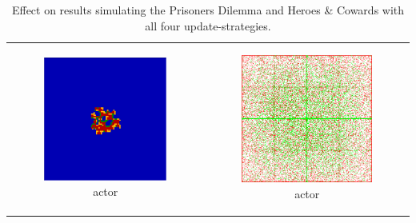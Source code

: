 \begin{table}
\begin{tabular}{c c}
		\begin{subfigure}[b]{0.4\textwidth}
			\centering
			\includegraphics[width=.7\textwidth, angle=0]{./fig/act_SG_scala.png}
			\caption{actor}
			\label{fig:pd_act}
		\end{subfigure}
    	& 
		\begin{subfigure}[b]{0.4\textwidth}
			\centering
			\includegraphics[width=.7\textwidth, angle=0]{./fig/act_HAC_100_000_500steps_scala.png}
			\caption{actor}
			\label{fig:hac_act}
		\end{subfigure}

	\end{tabular}
	
	\caption{\small Effect on results simulating the Prisoners Dilemma and Heroes \& Cowards with all four update-strategies.} 
	\label{fig:results}
\end{table}

